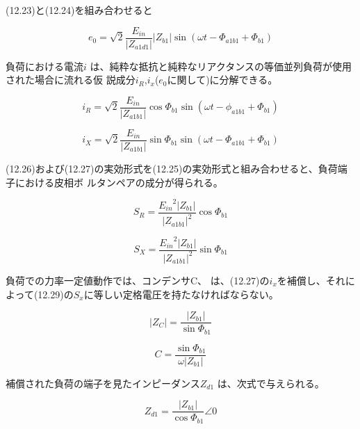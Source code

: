 \documentclass[fleqn,11pt,a4paper,dvipdfmx]{jsarticle}
\numberwithin{equation}{section}
\begin{document}
(12.23)と(12.24)を組み合わせると

\begin{equation}
  e_0 = \sqrt{2} \frac{E_{in}}{\left|Z_{a1d1}\right|} \left|Z_{b1}\right| \sin \left(\omega t - \Phi_{a1b1} + \Phi_{b1}\right)
\end{equation}

負荷における電流$i$ は、純粋な抵抗と純粋なリアクタンスの等価並列負荷が使用された場合に流れる仮 説成分$i_R$,$i_x$($e_0$に関して)に分解できる。

\begin{equation}
  i_R = \sqrt{2} \frac{E_{in}}{\left|Z_{a1b1}\right|} \cos \Phi_{b1} \sin \left(\omega t - \phi_{a1b1} + \Phi_{b1}\right)
\end{equation}

\begin{equation}
  i_X = \sqrt{2} \frac{E_{in}}{\left|Z_{a1b1}\right|} \sin \Phi_{b1} \sin \left(\omega t - \Phi_{a1b1} + \Phi_{b1}\right)
\end{equation}

(12.26)および(12.27)の実効形式を(12.25)の実効形式と組み合わせると、負荷端子における皮相ボ ルタンペアの成分が得られる。

\begin{equation}
  S_R = \frac{{E_{in}}^2 \left|Z_{b1}\right|}{{\left|Z_{a1b1}\right|}^2}\cos\Phi_{b1}
\end{equation}
\newpage

\begin{equation}
  S_X = \frac{{E_{in}}^2 \left|Z_{b1}\right|}{{\left|Z_{a1b1}\right|}^2}\sin\Phi_{b1}
\end{equation}

負荷での力率一定値動作では、コンデンサC、
は、(12.27)の$i_x$を補償し、それによって(12.29)の$S_x$に等しい定格電圧を持たなければならない。

\begin{equation}
  \left|Z_C\right| = \frac{\left|Z_{b1}\right|}{\sin \Phi_{b1}}
\end{equation}

\begin{equation}
  C = \frac{\sin \Phi_{b1}}{\omega \left|Z_{b1}\right|}
\end{equation}

補償された負荷の端子を見たインピーダンス$Z_{d1}$ は、次式で与えられる。

\begin{equation}
  Z_{d1} = \frac{\left|Z_{b1}\right|}{\cos \Phi_{b1}} \angle 0
\end{equation}
\end{document}
